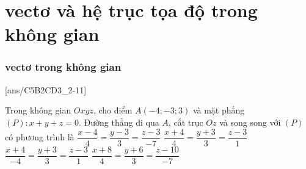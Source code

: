 \part{vectơ và hệ trục tọa độ trong không gian}
\section{vectơ trong không gian}
[ans/C5B2CD3_2-11]
\TN
\begin{ex}%
	Trong không gian $Oxyz$, cho điểm $A(-4;-3;3)$ và mặt phẳng $(P)\colon x+y+z=0$. Đường thẳng đi qua $A$, cắt trục $Oz$ và song song với $(P)$ có phương trình là
	\choice
	{$\dfrac{x-4}{4}=\dfrac{y-3}{3}=\dfrac{z-3}{-7}$}
	{$\dfrac{x+4}{4}=\dfrac{y+3}{3}=\dfrac{z-3}{1}$}
	{$\dfrac{x+4}{-4}=\dfrac{y+3}{3}=\dfrac{z-3}{1}$}
	{\True $\dfrac{x+8}{4}=\dfrac{y+6}{3}=\dfrac{z-10}{-7}$}
\end{ex}	
